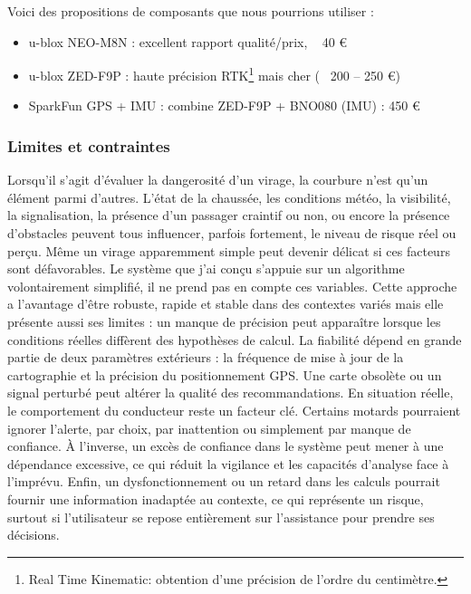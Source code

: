 Voici des propositions de composants que nous pourrions utiliser : 
\begin{itemize}
  \item u-blox NEO-M8N : excellent rapport qualité/prix, ~ 40 €
  \item u-blox ZED-F9P : haute précision RTK\footnote{Real Time Kinematic: obtention d'une précision de l’ordre du centimètre.} mais cher (~ 200 – 250 €)
  \item SparkFun GPS + IMU : combine ZED-F9P + BNO080 (IMU) : 450 €
\end{itemize}
\vspace{0.5cm}

\subsubsection{Limites et contraintes}
Lorsqu’il s’agit d’évaluer la dangerosité d’un virage, la courbure n’est qu’un élément parmi d’autres. L’état de la chaussée, les conditions météo, la visibilité, la signalisation, la présence d'un passager craintif ou non, ou encore la présence d’obstacles peuvent tous influencer, parfois fortement, le niveau de risque réel ou perçu. Même un virage apparemment simple peut devenir délicat si ces facteurs sont défavorables.
Le système que j’ai conçu s’appuie sur un algorithme volontairement simplifié, il ne prend pas en compte ces variables. Cette approche a l’avantage d’être robuste, rapide et stable dans des contextes variés mais elle présente aussi ses limites : un manque de précision peut apparaître lorsque les conditions réelles diffèrent des hypothèses de calcul. La fiabilité dépend en grande partie de deux paramètres extérieurs : la fréquence de mise à jour de la cartographie et la précision du positionnement GPS. Une carte obsolète ou un signal perturbé peut altérer la qualité des recommandations.
En situation réelle, le comportement du conducteur reste un facteur clé. Certains motards pourraient ignorer l’alerte, par choix, par inattention ou simplement par manque de confiance. À l’inverse, un excès de confiance dans le système peut mener à une dépendance excessive, ce qui réduit la vigilance et les capacités d’analyse face à l’imprévu.
Enfin, un dysfonctionnement ou un retard dans les calculs pourrait fournir une information inadaptée au contexte, ce qui représente un risque, surtout si l’utilisateur se repose entièrement sur l’assistance pour prendre ses décisions.
\vspace{0.5cm}

